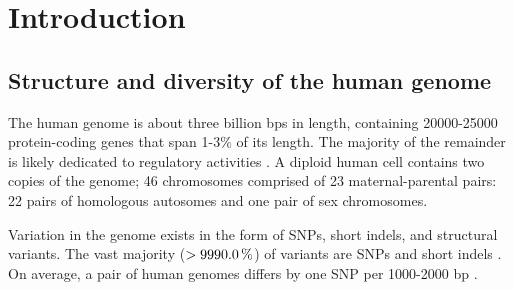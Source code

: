 %
%


\chapter{Introduction}

\begin{outline}

\section{Structure and diversity of the human genome}

\1 The human genome is about three billion \glspl{bp} in length, containing 20000-25000 protein-coding genes \autocite{1000genomesprojectconsortium2015GlobalReferenceHuman,theencodeprojectconsortium2012IntegratedEncyclopediaDNA} that span 1-3\% of its length.
The majority of the remainder is likely dedicated to regulatory activities \autocite{theencodeprojectconsortium2012IntegratedEncyclopediaDNA}.
A diploid human cell contains two copies of the genome; 46 chromosomes comprised of 23 maternal-parental pairs: 22 pairs of homologous autosomes and one pair of sex chromosomes.

\1 Variation in the genome exists in the form of \glspl{SNP}, short indels, and structural variants.
The vast majority ($> \percentage{99.9}$) of variants are \glspl{SNP} and short indels \autocite{1000genomesprojectconsortium2015GlobalReferenceHuman}.
On average, a pair of human genomes differs by one \gls{SNP} per 1000-2000 \gls{bp} \autocite{theinternationalsnpmapworkinggroup2001MapHumanGenome}.


\end{outline}
